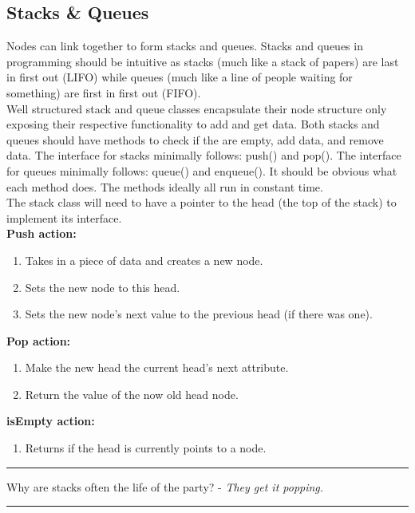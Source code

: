 \documentclass[letterpaper, 10pt]{article}
\begin{document}
\subsection{Stacks \& Queues}
Nodes can link together to form stacks and queues.
Stacks and queues in programming should be intuitive as stacks (much like a stack of papers)
are last in first out (LIFO) while queues (much like a line of people waiting for something) are first in first out (FIFO).\\
\newline
Well structured stack and queue classes encapsulate their node structure only exposing their 
respective functionality to add and get data. Both stacks and queues should have methods to check if the are empty, add data, and remove data.
The interface for stacks minimally follows: push() and pop(). The interface for queues minimally follows:
queue() and enqueue(). It should be obvious what each method does. The methods ideally all run
in constant time. \\
\newline
The stack class will need to have a pointer to the head (the top of the stack) to implement its interface.\\
\textbf{Push action:}
\begin{enumerate}
    \item Takes in a piece of data and creates a new node.
    \item Sets the new node to this head.
    \item Sets the new node's next value to the previous head (if there was one).
\end{enumerate}

\textbf{Pop action:}
\begin{enumerate}
    \item Make the new head the current head's next attribute.
    \item Return the value of the now old head node.
\end{enumerate}

\textbf{isEmpty action:}
\begin{enumerate}
    \item Returns if the head is currently points to a node.
\end{enumerate}
\hrule
\vspace{.25cm}
Why are stacks often the life of the party? - \textit{They get it popping.}\\
\hrule
\vspace{1cm}
\end{document}
